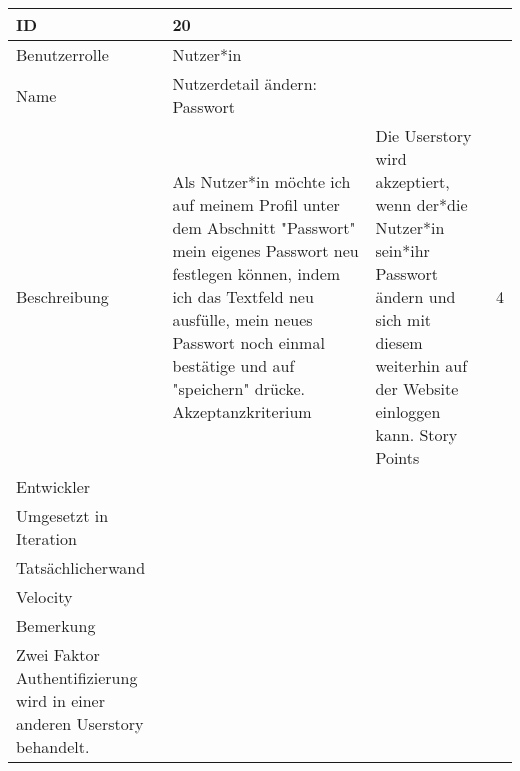 \begin{tabularx}{\textwidth}{|p{}|X|}
	\hline
	ID & 20\\
	\hline
	Benutzerrolle & Nutzer*in\\
	\hline
	Name & Nutzerdetail ändern: Passwort\\
	\hline
	Beschreibung & Als Nutzer*in möchte ich auf meinem Profil unter dem Abschnitt "Passwort" mein eigenes Passwort neu festlegen können, indem ich das Textfeld neu ausfülle, mein neues Passwort noch einmal bestätige und auf "speichern" drücke.
	\hline
	Akzeptanzkriterium & Die Userstory wird akzeptiert, wenn der*die Nutzer*in sein*ihr Passwort ändern und sich mit diesem weiterhin auf der Website einloggen kann.
	\hline
	Story Points & 4\\
	\hline
	Entwickler & \\
	\hline
	Umgesetzt in Iteration & \\ 
	\hline
	Tatsächlicherwand & \\
	\hline
	Velocity & \\
	\hline
	Bemerkung & \\
Zwei Faktor Authentifizierung wird in einer anderen Userstory behandelt.
	\hline
\end{tabularx}
\vspace{20pt}
